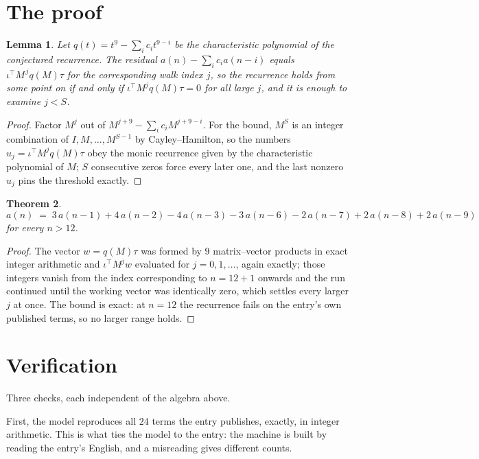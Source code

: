 \documentclass[11pt,a4paper]{article}
\theoremstyle{plain}
\newtheorem{theorem}{Theorem}
\newtheorem{lemma}[theorem]{Lemma}
\theoremstyle{definition}
\begin{document}
\section{The proof}

\begin{lemma}\label{lem:crit}
Let $q(t)=t^{9}-\sum_i c_it^{9-i}$ be the characteristic polynomial of the
conjectured recurrence. The residual $a(n)-\sum_ic_ia(n-i)$ equals
$\iota^{\!\top}M^{\,j}q(M)\tau$ for the corresponding walk index $j$, so the recurrence
holds from some point on if and only if $\iota^{\!\top}M^{j}q(M)\tau=0$ for all large $j$,
and it is enough to examine $j<S$.
\end{lemma}

\begin{proof}
Factor $M^{j}$ out of $M^{j+9}-\sum_ic_iM^{j+9-i}$. For the bound, $M^{S}$
is an integer combination of $I,M,\dots,M^{S-1}$ by Cayley--Hamilton, so the numbers
$u_j=\iota^{\!\top}M^{j}q(M)\tau$ obey the monic recurrence given by the characteristic
polynomial of $M$; $S$ consecutive zeros force every later one, and the last nonzero $u_j$
pins the threshold exactly.
\end{proof}

\begin{theorem}
\[
a(n)\;=\;3\,a(n-1) + 4\,a(n-2) - 4\,a(n-3) - 3\,a(n-6) - 2\,a(n-7) + 2\,a(n-8) + 2\,a(n-9)
\]
for every $n>12$.
\end{theorem}

\begin{proof}
The vector $w=q(M)\tau$ was formed by $9$ matrix--vector products in exact integer
arithmetic and $\iota^{\!\top}M^{j}w$ evaluated for $j=0,1,\dots$, again exactly; those
integers vanish from the index corresponding to $n=12+1$ onwards and the run continued
until the working vector was identically zero, which settles every larger $j$ at once. The bound is exact: at $n=12$ the recurrence fails on the entry's own published terms, so no larger range holds.
\end{proof}

\section{Verification}

Three checks, each independent of the algebra above.

First, the model reproduces all $24$ terms the entry publishes, exactly, in integer
arithmetic. This is what ties the model to the entry: the machine is built by reading the
entry's English, and a misreading gives different counts.
\end{document}
